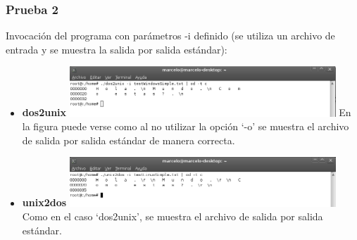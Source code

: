 \documentclass[a4paper,10pt]{article}
\begin{document}
    \subsubsection{Prueba 2}
    Invocaci\'on del programa con par\'ametros -i definido (se utiliza un archivo de entrada y se muestra
    la salida por salida est\'andar):
    \begin{itemize}
      \item \textbf{dos2unix}
      \newline
      \includegraphics[width=10cm, viewport=0 0 902 170]{../Informe/Imagenes/prueba2-invocacion-dos2unix.png}
      \newline	
      En la figura puede verse como al no utilizar la opci\'on `-o' se muestra el archivo de salida por
      salida est\'andar de manera correcta.	
      \item \textbf{unix2dos}
      \newline 
      \includegraphics[width=10cm, viewport=0 0 898 167]{../Informe/Imagenes/prueba2-invocacion-unix2dos.png}		
      \newline
      Como en el caso `dos2unix', se muestra el archivo de salida por salida est\'andar.
    \end{itemize}
\end{document}
